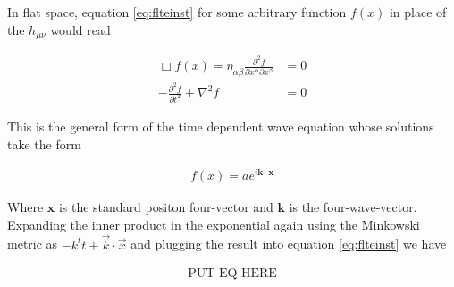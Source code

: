 In flat space, equation \ref{eq:flteinst} for some arbitrary function $f(x)$ in place of the $h_{\mu \nu}$ would read

\begin{align}
\Box f(x) = \eta_{\alpha \beta} \frac{\partial^2 f}{\partial x^{\alpha} \partial x^{\beta}} &= 0\\
-\frac{\partial^2 f}{\partial t^2} + \nabla^2f &= 0
\end{align} 

This is the general form of the time dependent wave equation whose solutions take the form

\begin{align}
f(x) = a e^{i \mathbf{k} \cdot \mathbf{x}}
\end{align}

Where $\mathbf{x}$ is the standard positon four-vector and $\mathbf{k}$ is the four-wave-vector. Expanding the inner product in the exponential again using the Minkowski metric as $-k^t t + \vec{k}\cdot \vec{x}$ and plugging the result into equation \ref{eq:flteinst} we have 

\begin{align}
\text{PUT EQ HERE}
\end{align}




